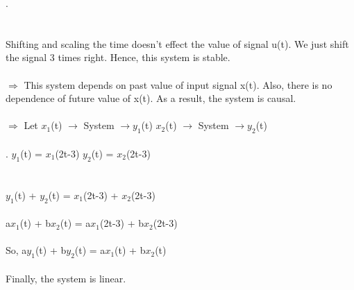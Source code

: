 \documentclass[10pt,a4paper, margin=1in]{article}
\begin{document}
\begin{enumerate}
\begin{enumerate}
    .\\\\\\
    Shifting and scaling the time doesn't effect the value of signal u(t). We just shift the signal 3 times right. Hence, this system is stable.\\\\
    $\Rightarrow$ This system depends on past value of input signal x(t). Also, there is no dependence of future value of x(t). As a result, the system is causal.\\\\
    $\Rightarrow$ Let $x_{1}$(t) $\rightarrow$  System $\rightarrow y_{1}$(t) \hspace{5cm} $x_{2}$(t) $\rightarrow$  System $\rightarrow y_{2}$(t)\\\\
    .\hspace{0.7cm} $y_{1}$(t) = $x_{1}$(2t-3) \hspace{6.7cm} $y_{2}$(t) = $x_{2}$(2t-3)\\\\\\
    $y_{1}$(t) + $y_{2}$(t) = $x_{1}$(2t-3) + $x_{2}$(2t-3)\\\\
    a$x_{1}$(t) + b$x_{2}$(t) = a$x_{1}$(2t-3) + b$x_{2}$(2t-3)\\\\
    So, a$y_{1}$(t) + b$y_{2}$(t) = a$x_{1}$(t) + b$x_{2}$(t)\\\\
    Finally, the system is linear.\\\\\\
    

\end{enumerate}
\end{enumerate}
\end{document}
